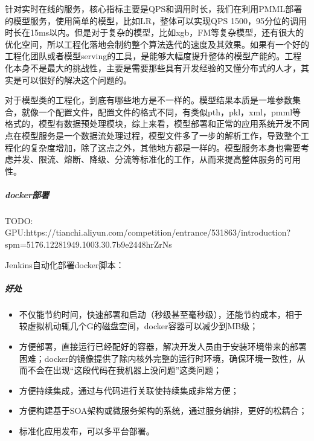 \documentclass[letterpaper,10pt,english]{sphinxmanual}
\begin{document}
针对实时在线的服务，核心指标主要是QPS和调用时长，我们在利用PMML部署的模型服务，使用简单的模型，比如LR，整体可以实现QPS
1500，95分位的调用时长在15ms以内。但是对于复杂的模型，比如xgb，FM等复杂模型，还有很大的优化空间，所以工程化落地会制约整个算法迭代的速度及其效果。如果有一个好的工程化团队或者模型serving的工具，是能够大幅度提升整体的模型产能的。工程化本身不是最大的挑战性，主要是需要那些具有开发经验的又懂分布式的人才，其实是可以很好的解决这个问题的。

对于模型类的工程化，到底有哪些地方是不一样的。模型结果本质是一堆参数集合，就像一个配置文件，配置文件的格式不同，有类似pth，pkl，xml，pmml等格式的，模型有数据预处理模块，综上来看，模型部署和正常的应用系统开发不同点在模型服务是一个数据流处理过程，模型文件多了一步的解析工作，导致整个工程化的复杂度增加，除了这点之外，其他地方都是一样的。模型服务本身也需要考虑并发、限流、熔断、降级、分流等标准化的工作，从而来提高整体服务的可用性。


\subparagraph{docker部署}
\label{\detokenize{chapter_AI_dive/AI_deploy:docker}}


TODO:
GPU:https://tianchi.aliyun.com/competition/entrance/531863/introduction?spm=5176.12281949.1003.30.7b9e2448hrZrNs

Jenkins自动化部署docker脚本：


\subparagraph{好处}
\label{\detokenize{chapter_AI_dive/AI_deploy:id2}}\begin{itemize}
\item {} 
不仅能节约时间，快速部署和启动（秒级甚至毫秒级），还能节约成本，相于较虚拟机动辄几个G的磁盘空间，docker容器可以减少到MB级；

\item {} 
方便部署，直接运行已经配好的容器，解决开发人员由于安装环境带来的部署困难；docker的镜像提供了除内核外完整的运行时环境，确保环境一致性，从而不会在出现“这段代码在我机器上没问题”这类问题；

\item {} 
方便持续集成，通过与代码进行关联使持续集成非常方便；

\item {} 
方便构建基于SOA架构或微服务架构的系统，通过服务编排，更好的松耦合；

\item {} 
标准化应用发布，可以多平台部署。

\end{itemize}
\end{document}
